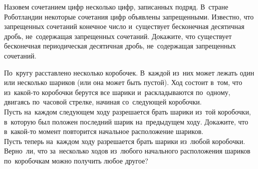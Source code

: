 \begin{problems}
\item
Назовем сочетанием цифр несколько цифр, записанных подряд.
В~стране Роботландии некоторые сочетания цифр объявлены запрещенными.
Известно, что запрещенных сочетаний конечное число и~существует бесконечная
десятичная дробь, не~содержащая запрещенных сочетаний.
Докажите, что существует бесконечная периодическая десятичная дробь,
не~содержащая запрещенных сочетаний.

\item
По~кругу расставлено несколько коробочек.
В~каждой из~них может лежать один или несколько шариков (или она может быть
пустой).
Ход состоит в~том, что из~какой-то коробочки берутся все шарики
и~раскладываются по~одному, двигаясь по~часовой стрелке, начиная со~следующей
коробочки.
\\
\subproblem
Пусть на~каждом следующем ходу разрешается брать шарики из~той коробочки,
в~которую был положен последний шарик на~предыдущем ходу.
Докажите, что в~какой-то момент повторится начальное расположение шариков.
\\
\subproblem
Пусть теперь на~каждом ходу разрешается брать шарики из~любой коробочки.
Верно~ли, что за~несколько ходов из~любого начального расположения шариков
по~коробочкам можно получить любое другое?

\end{problems}

